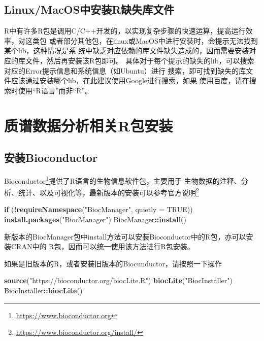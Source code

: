 \documentclass[]{ctexbook}
\newenvironment{Shaded}{\begin{snugshade}}{\end{snugshade}}
\newcommand{\ControlFlowTok}[1]{\textcolor[rgb]{0.13,0.29,0.53}{\textbf{#1}}}
\newcommand{\DataTypeTok}[1]{\textcolor[rgb]{0.13,0.29,0.53}{#1}}
\newcommand{\KeywordTok}[1]{\textcolor[rgb]{0.13,0.29,0.53}{\textbf{#1}}}
\newcommand{\NormalTok}[1]{#1}
\newcommand{\OperatorTok}[1]{\textcolor[rgb]{0.81,0.36,0.00}{\textbf{#1}}}
\newcommand{\OtherTok}[1]{\textcolor[rgb]{0.56,0.35,0.01}{#1}}
\newcommand{\StringTok}[1]{\textcolor[rgb]{0.31,0.60,0.02}{#1}}
\renewcommand{\href}[2]{#2\footnote{\url{#1}}}
\begin{document}
\hypertarget{linuxmacosr}{%
\subsection{Linux/MacOS中安装R缺失库文件}\label{linuxmacosr}}

R中有许多R包是调用C/C++开发的，以实现复杂步骤的快速运算，提高运行效率，对这类包
或者部分其他包，在linux或MacOS中进行安装时，会提示无法找到某个lib，这种情况是系
统中缺乏对应依赖的库文件缺失造成的，因而需要安装对应的库文件，然后再安装该R包即可。
具体对于每个提示的缺失的lib，可以搜索对应的Error提示信息和系统信息（如Ubuntu）进行
搜索，即可找到缺失的库文件应该通过安装哪个lib，在此建议使用Google进行搜索，如果
使用百度，请在搜索时使用``R语言''而非``R''。

\hypertarget{r}{%
\section{质谱数据分析相关R包安装}\label{r}}

\hypertarget{bioconductor}{%
\subsection{安装Bioconductor}\label{bioconductor}}

\href{https://www.bioconductor.org}{Bioconductor}提供了R语言的生物信息软件包，主要用于
生物数据的注释、分析、统计、以及可视化等，最新版本的安装可以参考\href{https://www.bioconductor.org/install/}{官方说明}

\begin{Shaded}
\begin{Highlighting}[]
\ControlFlowTok{if}\NormalTok{ (}\OperatorTok{!}\KeywordTok{requireNamespace}\NormalTok{(}\StringTok{"BiocManager"}\NormalTok{, }\DataTypeTok{quietly =} \OtherTok{TRUE}\NormalTok{))}
    \KeywordTok{install.packages}\NormalTok{(}\StringTok{"BiocManager"}\NormalTok{)}
\NormalTok{BiocManager}\OperatorTok{::}\KeywordTok{install}\NormalTok{()}
\end{Highlighting}
\end{Shaded}

新版本的BiocManager包中install方法可以安装Bioconductor中的R包，亦可以安装CRAN中的
R包，因而可以统一使用该方法进行R包安装。

如果是旧版本的R，或者安装旧版本的Biocunductor，请按照一下操作

\begin{Shaded}
\begin{Highlighting}[]
\KeywordTok{source}\NormalTok{(}\StringTok{"https://bioconductor.org/biocLite.R"}\NormalTok{)}
\KeywordTok{biocLite}\NormalTok{(}\StringTok{"BiocInstaller"}\NormalTok{)}
\NormalTok{BiocInstaller}\OperatorTok{::}\KeywordTok{biocLite}\NormalTok{()}
\end{Highlighting}
\end{Shaded}
\end{document}

